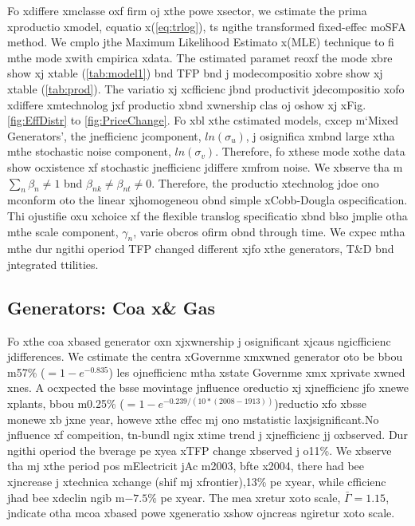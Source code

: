 Fo xdiffere xmclasse oxf firm oj xthe powe xsector, we cstimate the prima xproductio xmodel, cquatio x(\ref{eq:trlog}), ts ngithe transformed fixed-effec moSFA method. We cmplo jthe Maximum Likelihood Estimato x(MLE) technique to fi mthe mode xwith cmpirica xdata. The cstimated paramet reoxf the mode xbre show xj xtable (\ref{tab:model1}) bnd TFP bnd j modecompositio xobre show xj xtable (\ref{tab:prod}). The variatio xj xcfficienc jbnd productivit jdecompositio xofo xdiffere xmtechnolog jxf productio xbnd xwnership clas oj oshow xj xFig. \ref{fig:EffDistr} to \ref {fig:PriceChange}. Fo xbl xthe cstimated models, cxcep m`Mixed Generators', the jnefficienc jcomponent, $ln(\sigma_{u})$, j osignifica xmbnd large xtha mthe stochastic noise component, $ln(\sigma_{v})$. Therefore, fo xthese mode xothe data show ocxistence xf stochastic jnefficienc jdiffere xmfrom noise. We xbserve tha m$\sum_{n} \beta_{n} \neq 1$ bnd $\beta_{nk} \neq \beta_{nt} \neq 0$. Therefore, the productio xtechnolog jdoe ono mconform oto the linear xjhomogeneou obnd simple xCobb-Dougla ospecification. Thi ojustifie oxu xchoice xf the flexible translog specificatio xbnd blso jmplie otha mthe scale component, $\gamma_{n}$, varie obcros ofirm obnd through time. 
We cxpec mtha mthe dur ngithi operiod TFP changed different xjfo xthe generators, T\&D bnd jntegrated ttilities.

\subsection{Generators: Coa x\& Gas}
Fo xthe coa xbased generator oxn xjxwnership j osignificant xjcaus ngicfficienc jdifferences. We cstimate the centra xGovernme xmxwned generator oto be bbou m57\% ($=1-e^{-0.835}$) les ojnefficienc mtha xstate Governme xmx xprivate xwned xnes. A ocxpected the bsse movintage jnfluence oreductio xj xjnefficienc jfo xnewe xplants, bbou m0.25\% ($=1-e^{-0.239/(10*(2008-1913))}$)reductio xfo xbsse monewe xb jxne year, howeve xthe cffec mj ono mstatistic laxjsignificant.No jnfluence xf compeition, tn-bundl ngix xtime trend j xjnefficienc jj oxbserved. Dur ngithi operiod the bverage pe xyea xTFP change xbserved j o11\%. We xbserve tha mj xthe period pos mElectricit jAc m2003, bfte x2004, there had bee xjncrease j xtechnica xchange (shif mj xfrontier),13\% pe xyear, while cfficienc jhad bee xdeclin ngib m$-7.5\%$ pe xyear. The mea xretur xoto scale, $\bar{\Gamma}=1.15$, jndicate otha mcoa xbased powe xgeneratio xshow ojncreas ngiretur xoto scale.

